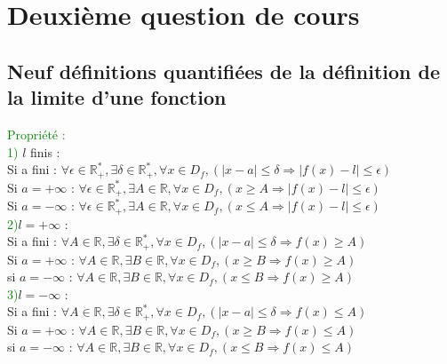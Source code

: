 \documentclass{article}
\begin{document}
\section{Deuxième question de cours}
\subsection{Neuf définitions quantifiées de la définition de la limite d'une fonction}
\textcolor{green}{Propriété :} \\ 
\textcolor{green}{1)} $l$ finis : \\ 
Si a fini : $\forall \epsilon \in \mathbb{R}^*_+, \exists \delta \in \mathbb{R}^*_+, \forall x \in D_f,(|x-a|\leq \delta \Rightarrow |f(x)-l|\leq \epsilon)$ \\ 
Si $a= + \infty$ : $\forall \epsilon \in \mathbb{R}^*_+, \exists A \in \mathbb{R}, \forall x \in D_f,(x\geq A \Rightarrow |f(x)-l|\leq \epsilon)$ \\ 
Si $a= - \infty$ : $\forall \epsilon \in \mathbb{R}^*_+, \exists A \in \mathbb{R}, \forall x \in D_f,(x\leq A \Rightarrow |f(x)-l|\leq \epsilon)$ \\ 
\textcolor{green}{2)}$l=+ \infty$ : \\ 
Si a fini : $\forall A \in \mathbb{R}, \exists \delta \in \mathbb{R}^*_+, \forall x \in D_f,(|x-a|\leq \delta \Rightarrow f(x)\geq A)$ \\
Si $a=+\infty$ : $\forall A \in \mathbb{R}, \exists B \in \mathbb{R}, \forall x \in D_f,(x \geq B \Rightarrow f(x)\geq A)$ \\
si $a=- \infty$ : $\forall A \in \mathbb{R}, \exists B \in \mathbb{R}, \forall x \in D_f,(x \leq B \Rightarrow f(x)\geq A)$ \\
\textcolor{green}{3)}$l=-\infty$ : \\ 
Si a fini : $\forall A \in \mathbb{R}, \exists \delta \in \mathbb{R}^*_+, \forall x \in D_f,(|x-a|\leq \delta \Rightarrow f(x)\leq A)$ \\
Si $a=+\infty$ : $\forall A \in \mathbb{R}, \exists B \in \mathbb{R}, \forall x \in D_f,(x \geq B \Rightarrow f(x)\leq A)$ \\ 
si $a=- \infty$ : $\forall A \in \mathbb{R}, \exists B \in \mathbb{R}, \forall x \in D_f,(x \leq B \Rightarrow f(x)\leq A)$ \\ 
\end{document}
